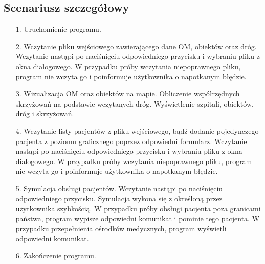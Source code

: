 \documentclass[]{article}
\begin{document}
    \subsection{Scenariusz szczegółowy}
    \begin{enumerate}
        \item[1.] Uruchomienie programu.
        \item[2.] Wczytanie pliku wejściowego zawierającego dane OM, obiektów oraz dróg.
            \subitem[2.1.] Wczytanie nastąpi po naciśnięciu odpowiedniego przycisku i wybraniu pliku z okna dialogowego.
            \subitem[2.2.] W przypadku próby wczytania niepoprawnego pliku, program nie wczyta go i poinformuje użytkownika o napotkanym błędzie.
        \item[3.] Wizualizacja OM oraz obiektów na mapie.
            \subitem[3.1.] Obliczenie współrzędnych skrzyżowań na podstawie wczytanych dróg.
            \subitem[3.2.] Wyświetlenie szpitali, obiektów, dróg i skrzyżowań.
        \item[4.] Wczytanie listy pacjentów z pliku wejściowego, bądź dodanie pojedynczego pacjenta z poziomu graficznego poprzez odpowiedni formularz.
            \subitem[4.1.] Wczytanie nastąpi po naciśnięciu odpowiedniego przycisku i wybraniu pliku z okna dialogowego.
            \subitem[4.2.] W przypadku próby wczytania niepoprawnego pliku, program nie wczyta go i poinformuje użytkownika o napotkanym błędzie.
        \item [5.]Symulacja obsługi pacjentów.
            \subitem[5.1.] Wczytanie nastąpi po naciśnięciu odpowiedniego przycisku.
            \subitem[5.2.] Symulacja wykona się z określoną przez użytkownika szybkością.
            \subitem[5.3.] W przypadku próby obsługi pacjenta poza granicami państwa, program wypisze odpowiedni komunikat i pominie tego pacjenta.
            \subitem[5.4.] W przypadku przepełnienia ośrodków medycznych, program wyświetli odpowiedni komunikat.
        \item[6.] Zakończenie programu.
    \end{enumerate}
        
\end{document}

